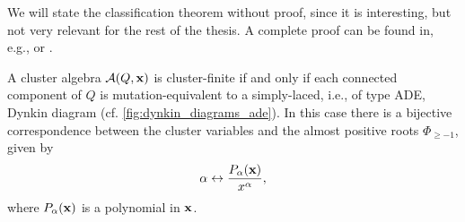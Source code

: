 We will state the classification theorem without proof, since it is interesting, but
not very relevant for the rest of the thesis. A complete proof can be found in, e.g.,
\cite{FominZelevinsky2003CAFin} or \cite{FominWilliams2021IntroductionCA_4-5}.
\begin{theorem}\label{thm:cluster_finite_classification}

	A cluster algebra $\mathcal{A} (Q, \mathbf{x})$ is cluster-finite if and only if each connected
	component of $Q$ is mutation-equivalent to a simply-laced, i.e., of type ADE, Dynkin
	diagram (cf. \cref{fig:dynkin_diagrams_ade}). In this case there
	is a bijective correspondence between the cluster variables and the almost positive
	roots $\Phi_{\geq -1}$, given by
	\begin{equation*}
		\alpha \leftrightarrow \frac{P_\alpha (\mathbf{x})}{x^\alpha},
	\end{equation*}
	where $P_\alpha (\mathbf{x})$ is a polynomial in $\mathbf{x}$.
\end{theorem}

